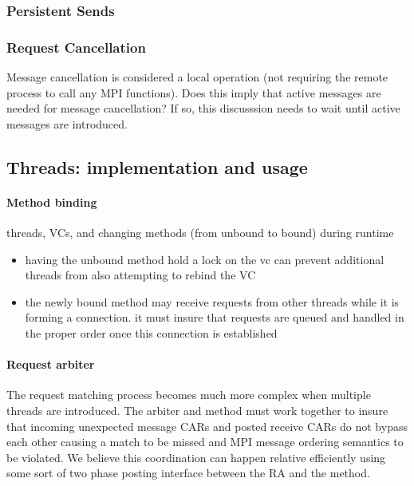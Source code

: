 \subsubsection{Persistent Sends}

\subsubsection{Request Cancellation}

\begin{cmt}
  Message cancellation is considered a local operation (not requiring the
  remote process to call any MPI functions).  Does this imply that active
  messages are needed for message cancellation?  If so, this discusssion needs
  to wait until active messages are introduced.
\end{cmt}


\subsection{Threads: implementation and usage}

\paragraph{Method binding} threads, VCs, and changing methods (from unbound
to bound) during runtime
\begin{itemize}
\item having the unbound method hold a lock on the vc can prevent additional
  threads from also attempting to rebind the VC
\item the newly bound method may receive requests from other threads while it
  is forming a connection.  it must insure that requests are queued and handled
  in the proper order once this connection is established
\end{itemize}

\paragraph{Request arbiter} The request matching process becomes much more
complex when multiple threads are introduced.  The arbiter and method must work
together to insure that incoming unexpected message CARs and posted receive
CARs do not bypass each other causing a match to be missed and MPI message
ordering semantics to be violated.  We believe this coordination can happen
relative efficiently using some sort of two phase posting interface between the
RA and the method.

